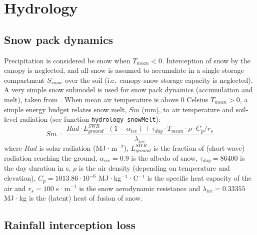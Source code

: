 \documentclass[]{book}
\begin{document}
\hypertarget{hydrology}{%
\chapter{Hydrology}\label{hydrology}}

\hypertarget{snowpack}{%
\section{Snow pack dynamics}\label{snowpack}}

Precipitation is considered be snow when \(T_{mean}<0\). Interception of snow by the canopy is neglected, and all snow is assumed to accumulate in a single storage compartment \(S_{snow}\) over the soil (i.e.~canopy snow storage capacity is neglected). A very simple snow submodel is used for snow pack dynamics (accumulation and melt), taken from \citet{Kergoat1998}. When mean air temperature is above 0 Celsius \(T_{mean}>0\), a simple energy budget relates snow melt, \(Sm\) (mm), to air temperature and soil-level radiation (see function \texttt{hydrology\_snowMelt}):
\begin{equation}
Sm = \frac{Rad\cdot L^{SWR}_{ground}\cdot (1-\alpha_{ice}) + \tau_{day} \cdot T_{mean} \cdot \rho \cdot C_p/r_{s}}{\lambda_{ice}}
\end{equation}
where \(Rad\) is solar radiation (MJ·m\(^{-2}\)), \(L^{SWR}_{ground}\) is the fraction of (short-wave) radiation reaching the ground, \(\alpha_{ice} = 0.9\) is the albedo of snow, \(\tau_{day} = 86400\) is the day duration in s, \(\rho\) is the air density (depending on temperature and elevation), \(C_{p} = 1013.86 \cdot 10^{-6}\) MJ·kg\(^{-1}\)·C\(^{-1}\) is the specific heat capacity of the air and \(r_{s} = 100\) s·m\(^{-1}\) is the snow aerodynamic resistance and \(\lambda_{ice} = 0.33355\)MJ·kg is the (latent) heat of fusion of snow.

\hypertarget{interception}{%
\section{Rainfall interception loss}\label{interception}}
\end{document}
